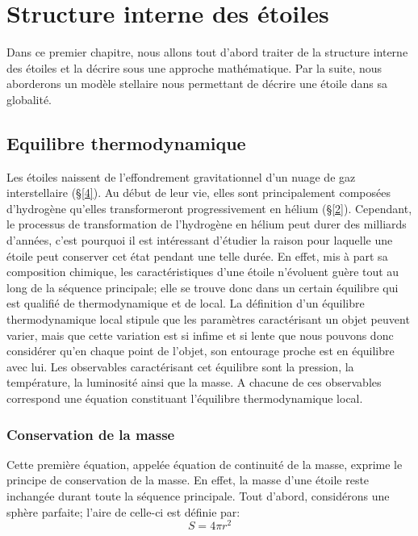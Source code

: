 


\chapter{Structure interne des étoiles}\label{1}
Dans ce premier chapitre, nous allons tout d'abord traiter de la structure interne des étoiles et la décrire sous une approche mathématique. Par la suite, nous aborderons un modèle stellaire nous permettant de décrire une étoile dans sa globalité.

\section{Equilibre thermodynamique}\label{1.1}

Les étoiles naissent de l'effondrement gravitationnel d'un nuage de gaz interstellaire (§\ref{4}). Au début de leur vie, elles sont principalement composées d'hydrogène qu'elles transformeront progressivement en hélium (§\ref{2}). Cependant, le processus de transformation de l'hydrogène en hélium peut durer des milliards d'années, c'est pourquoi il est intéressant d'étudier la raison pour laquelle une étoile peut conserver cet état pendant une telle durée. En effet, mis à part sa composition chimique, les caractéristiques d'une étoile n'évoluent guère tout au long de la séquence principale\footnotemark[1]; elle se trouve donc dans un certain équilibre qui est qualifié de thermodynamique et de local. La définition d'un équilibre thermodynamique local stipule que les paramètres caractérisant un objet peuvent varier, mais que cette variation est si infime et si lente que nous pouvons donc considérer qu'en chaque point de l'objet, son entourage proche est en équilibre avec lui. Les observables caractérisant cet équilibre sont la pression, la température, la luminosité ainsi que la masse. A chacune de ces observables correspond une équation constituant l'équilibre thermodynamique local.

\subsection{Conservation de la masse}\label{1.1.1}
Cette première équation, appelée équation de continuité de la masse, exprime le principe de conservation de la masse. En effet, la masse d'une étoile reste inchangée durant toute la séquence principale.\smallskip\newline
Tout d'abord, considérons une sphère parfaite\footnotemark[2]; l'aire de celle-ci est définie par:\begin{equation} S=4\pi r^{2}\label{Eq. 1.1}\end{equation}

